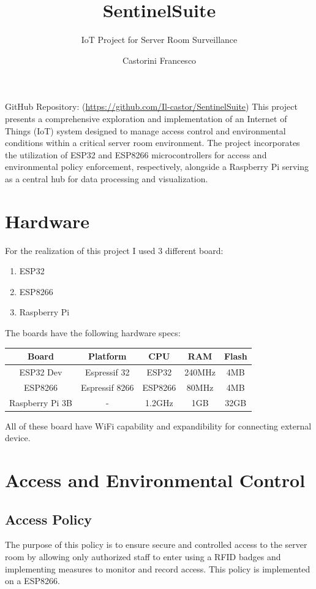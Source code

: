 \documentclass[]{scrartcl}
\title{SentinelSuite}
\subtitle{IoT Project for Server Room Surveillance}
\author{Castorini Francesco}
\date{}
\begin{document}
\maketitle
\noindent
GitHub Repository: (\textcolor{blue}{\url{https://github.com/Il-castor/SentinelSuite}})
\newline
\newline
\noindent
This project presents a comprehensive exploration and implementation of an Internet of
Things (IoT) system designed to manage access control and environmental conditions
within a critical server room environment. The project incorporates the utilization of
ESP32 and ESP8266 microcontrollers for access and environmental policy enforcement,
respectively, alongside a Raspberry Pi serving as a central hub for data processing and visualization.

\section{Hardware}
For the realization of this project I used 3 different board:
\begin{enumerate}
	\item ESP32
	\item ESP8266
	\item Raspberry Pi
\end{enumerate}
The boards have the following hardware specs:
\newline 
\begin{center}

\begin{tabular}{|c|c|c|c|c|}
	\hline
	Board & Platform & CPU & RAM & Flash \\
	\hline
	ESP32 Dev & Espressif 32 & ESP32 & 240MHz & 4MB \\
	ESP8266 & Espressif 8266 & ESP8266 & 80MHz & 4MB \\
	Raspberry Pi 3B & - & 1.2GHz & 1GB & 32GB \\
	\hline
\end{tabular}
\end{center}
\noindent
All of these board have WiFi capability and expandibility for connecting external device.
\section{Access and Environmental Control}
\subsection{Access Policy}
The purpose of this policy is to ensure secure and controlled access to the server room by allowing only authorized staff to enter using a RFID badges and implementing measures to monitor and record access. This policy is implemented on a ESP8266.
\end{document}
